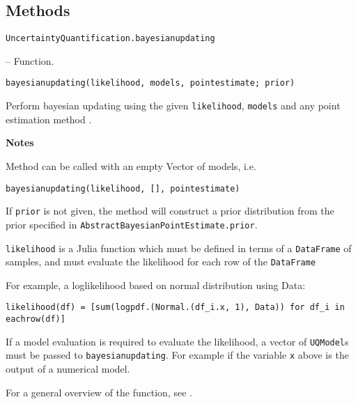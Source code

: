 \subsection{Methods}



\label{15695795754956981461}{}

\hypertarget{741170815147723344}{\texttt{UncertaintyQuantification.bayesianupdating}}  -- {Function.}

\begin{adjustwidth}{2em}{0pt}


\begin{verbatim}
bayesianupdating(likelihood, models, pointestimate; prior)
\end{verbatim}

Perform bayesian updating using the given \texttt{likelihood}, \texttt{models}  and any point estimation method .

\textbf{Notes}

Method can be called with an empty Vector of models, i.e.


\begin{verbatim}
bayesianupdating(likelihood, [], pointestimate)
\end{verbatim}

If \texttt{prior} is not given, the method will construct a prior distribution from the prior specified in \texttt{AbstractBayesianPointEstimate.prior}.

\texttt{likelihood} is a Julia function which must be defined in terms of a \texttt{DataFrame} of samples, and must evaluate the likelihood for each row of the \texttt{DataFrame}

For example, a loglikelihood based on normal distribution using {\textquotesingle}Data{\textquotesingle}:


\begin{verbatim}
likelihood(df) = [sum(logpdf.(Normal.(df_i.x, 1), Data)) for df_i in eachrow(df)]
\end{verbatim}

If a model evaluation is required to evaluate the likelihood, a vector of \texttt{UQModel}s must be passed to \texttt{bayesianupdating}. For example if the variable \texttt{x} above is the output of a numerical model.

For a general overview of the function, see .




\end{adjustwidth}
